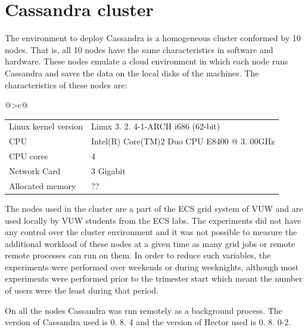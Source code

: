 \section{Cassandra cluster} \label{sexp:CassandraCluster}

The environment to deploy Cassandra is  a homogeneous cluster conformed by 10
nodes.  That is,  all 10 nodes have the same characteristics in software and
hardware.  These nodes emulate a cloud environment in which each node runs
Cassandra and saves the data on the local disks of the machines.  The
characteristics of these nodes are:

	\begin{table}[H] \label{texp:Nodeconfig}
	\centering
	\newcolumntype{C} {@{\hspace{2.5pt}}>{\scriptsize}c@{\hspace{2.5pt}}}
		\begin{tabular}{CC}
			\toprule
			
			Linux kernel version & Linux 3. 2. 4-1-ARCH i686 (62-bit)\\
			\rc CPU & Intel(R) Core(TM)2 Duo CPU     E8400  @ 3. 00GHz \\
			CPU cores & 4  \\
			\rc Network Card & 3 Gigabit \\
			Allocated memory & ?? \\
			\bottomrule
		\end{tabular}
	\end{table}
	
The nodes used in the cluster are a part of the ECS grid system of VUW and are
used locally by VUW  students from the ECS labs.  The experiments did not have
any control over the cluster environment and it was not possible to measure the
additional workload of these nodes at a given time as many grid jobs or remote
remote processes can run on them. 
In order to reduce such variables,  the experiments were performed over weekends
or during weeknights,  although most experiments were performed prior to the
trimester start which meant the number of users were the least during that
period.  

On all the nodes Cassandra was run remotely as a background process.  
The version of Cassandra used is 0. 8. 4 and the version of Hector used is
0. 8. 0-2. 

% 
% 


